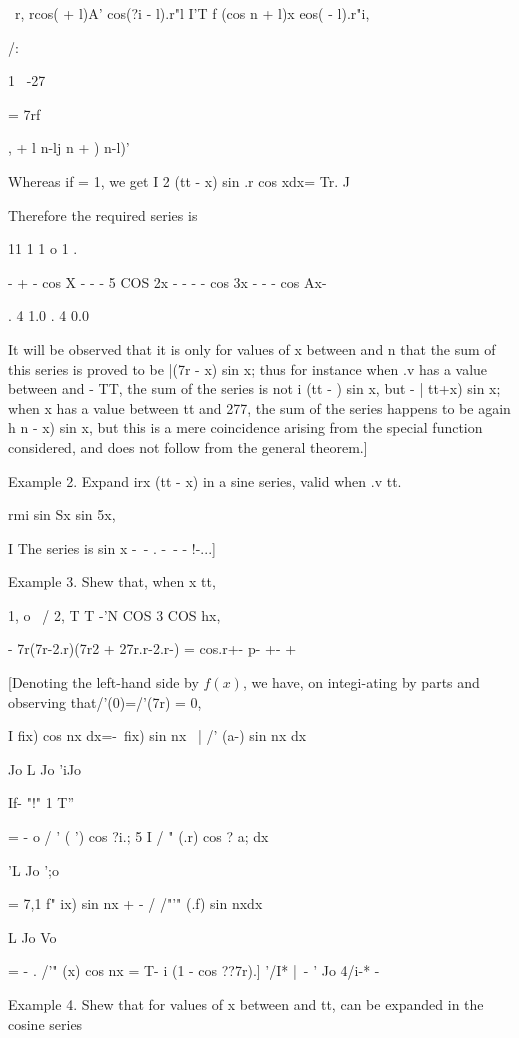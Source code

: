 \ r, rcos( + l)A' cos(?i - l).r"l I'T f (cos n + l)x eos( - l).r"i,

/:

1 \ -27

= 7rf

, + l n-lj n + ) n-l)'

Whereas if = 1, we get I 2 (tt - x) sin .r cos xdx= Tr. J

Therefore the required series is

11 1 1 o 1 .

- + - cos X - - - 5 COS 2x - - - - cos 3x - - - cos Ax-

. 4 1.0 . 4 0.0

It will be observed that it is only for values of x between and n that
the sum of this series is proved to be |(7r - x) sin x; thus for
instance when .v has a value between and - TT, the sum of the series
is not i (tt - ) sin x, but - | tt+x) sin x; when x has a value
between tt and 277, the sum of the series happens to be again h n - x)
sin x, but this is a mere coincidence arising from the special
function considered, and does not follow from the general theorem.]

Example 2. Expand irx (tt - x) in a sine series, valid when .v tt.

rmi  sin Sx sin 5x,

I The series is sin x -\ - . -\ - - !-...]

%
%

Example 3. Shew that, when x tt,

1, o \ / 2, T T -'N COS 3 COS hx,

- 7r(7r-2.r)(7r2 + 27r.r-2.r-) = cos.r+- p- +- +

[Denoting the left-hand side by $f(x)$, we have, on integi-ating by
parts and observing that/'(0)=/'(7r) = 0,

I fix) cos nx dx=-\ fix) sin nx \ | /' (a-) sin nx dx

Jo L Jo 'iJo

If- "!" 1 T''

= - o / ' ( ') cos ?i.; 5 I / " (.r) cos ? a; dx

 'L Jo ';o

= 7,1 f" ix) sin nx + - / /"'" (.f) sin nxdx

  L Jo Vo

= - . /'" (x) cos nx = T- i (1 - cos ??7r).] '/I* |\ - ' Jo 4/i-* -

Example 4. Shew that for values of x between and tt, can be expanded
in the cosine series


